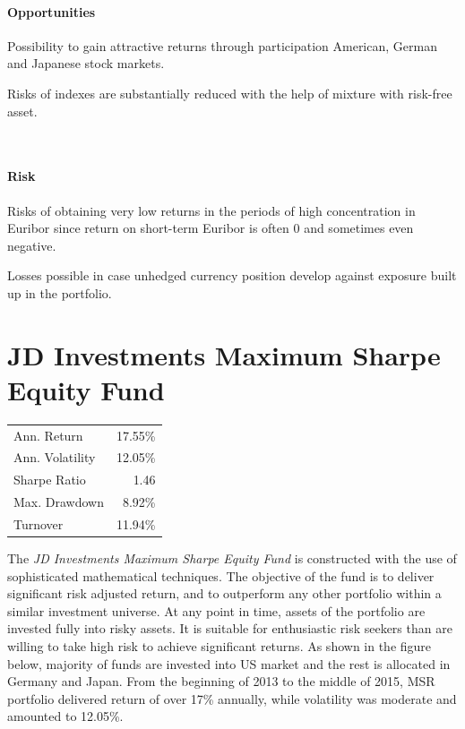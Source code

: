 \documentclass[11pt, parskip=full, DIV=14, headings=small, footsepline, footinclude=false, headsepline]{scrreprt}
\begin{document}
\begin{minipage}[t]{0.49\textwidth}
  \paragraph{Opportunities}
  \begin{sit}
    \item Possibility to gain attractive returns through participation American, German and Japanese stock markets.
    \item Risks of indexes are substantially reduced with the help of mixture with risk-free asset.
  \end{sit}
\end{minipage}
~~
\begin{minipage}[t]{0.49\textwidth}
  \paragraph{Risk}
  \begin{sit}
    \item Risks of obtaining very low returns in the periods of high concentration in Euribor since  return on short-term Euribor is often 0 and sometimes even negative. 
    \item Losses possible in case unhedged currency position develop against exposure built up in the portfolio.
  \end{sit}
\end{minipage}

\newpage\section{JD Investments Maximum Sharpe Equity Fund}
\begin{table}
  \begin{tabular}{lr}
\toprule
Ann. Return & 17.55\%\\
Ann. Volatility & 12.05\%\\
Sharpe Ratio & 1.46 \\
Max. Drawdown & 8.92\% \\
Turnover & 11.94\%\\
\bottomrule
\end{tabular}
\end{table}
The \textit{JD Investments Maximum Sharpe Equity Fund} is constructed with the use of sophisticated mathematical techniques. The objective of the fund is to deliver significant risk adjusted return, and to outperform any other portfolio within a similar investment universe. 
At any point in time, assets of the portfolio are invested fully into risky assets. It is suitable for enthusiastic risk seekers than are willing to take high risk to achieve significant returns. As shown in the figure below, majority of funds are invested into US market and the rest is allocated in Germany and Japan. From the beginning of 2013 to the middle of 2015, MSR portfolio delivered return of over 17\% annually, while volatility was moderate and amounted to 12.05\%. 
\end{document}
